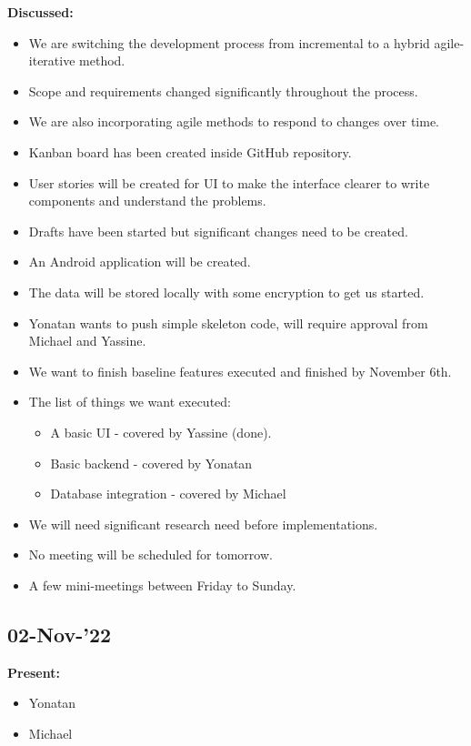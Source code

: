 \documentclass[11pt]{article}
\begin{document}
    \textbf{Discussed:}
    \begin{itemize}
        \item We are switching the development process from incremental to a hybrid agile-iterative method.
        \item Scope and requirements changed significantly throughout the process.
        \item We are also incorporating agile methods to respond to changes over time.
        \item Kanban board has been created inside GitHub repository.
        \item User stories will be created for UI to make the interface clearer to write components and understand the problems.
        \item Drafts have been started but significant changes need to be created.
        \item An Android application will be created.
        \item The data will be stored locally with some encryption to get us started.
        \item Yonatan wants to push simple skeleton code, will require approval from Michael and Yassine.
        \item We want to finish baseline features executed and finished by November 6th.
        \item The list of things we want executed:
        \begin{itemize}
            \item A basic UI - covered by Yassine (done).
            \item Basic backend - covered by Yonatan
            \item Database integration - covered by Michael
        \end{itemize}
        \item We will need significant research need before implementations.
        \item No meeting will be scheduled for tomorrow.
        \item A few mini-meetings between Friday to Sunday.
    \end{itemize}

    \subsection{02-Nov-’22}\label{subsec:02-nov-22}

    \textbf{Present:}
    \begin{itemize}
        \item Yonatan
        \item Michael
    \end{itemize}
\end{document}
